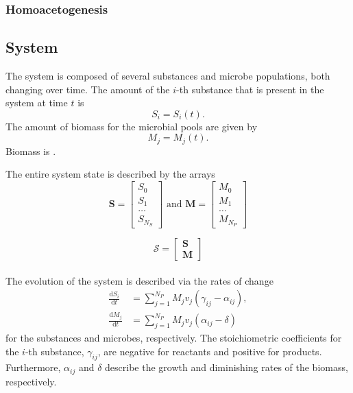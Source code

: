 \documentclass{article}
\begin{document}
\subsubsection{Homoacetogenesis}


\subsection{System}

The system is composed of several substances and microbe populations, both changing over time.
The amount of the $i$-th substance that is present in the system at time $t$ is 
\begin{equation}
S_i = S_i(t).
\end{equation}
The amount of biomass for the microbial pools are given by 
\begin{equation}
M_j = M_j(t).
\end{equation}
Biomass is .

The entire system state is described by the arrays
\begin{equation}
 \bm{S} = \begin{bmatrix}
        S_0\\
        S_1\\
        \ldots\\
        S_{N_S}
        \end{bmatrix}\text{ and }
        \bm{M} = \begin{bmatrix}
        M_0\\
        M_1\\
        \ldots\\
        M_{N_P}
        \end{bmatrix}
\end{equation}

\begin{equation}
\mathcal{S} = \begin{bmatrix}\bm{S}\\\bm{M}\end{bmatrix}
\end{equation}
\\

The evolution of the system is described via the rates of change
\begin{align}
\frac{\mathrm{d}S_i}{\mathrm{d}t} &= \sum_{j=1}^{N_P} M_j v_j  \left(\gamma_{ij} - \alpha_{ij}\right),\\
\frac{\mathrm{d}M_j}{\mathrm{d}t} &= \sum_{j=1}^{N_P} M_j v_j \left(\alpha_{ij} - \delta \right)
\end{align}
for the substances and microbes, respectively.
The stoichiometric coefficients for the $i$-th substance, $\gamma_{ij}$, are negative for reactants and positive for products.
Furthermore, $\alpha_{ij}$ and $\delta$ describe the growth and diminishing rates of the biomass, respectively.
\\
\end{document}
